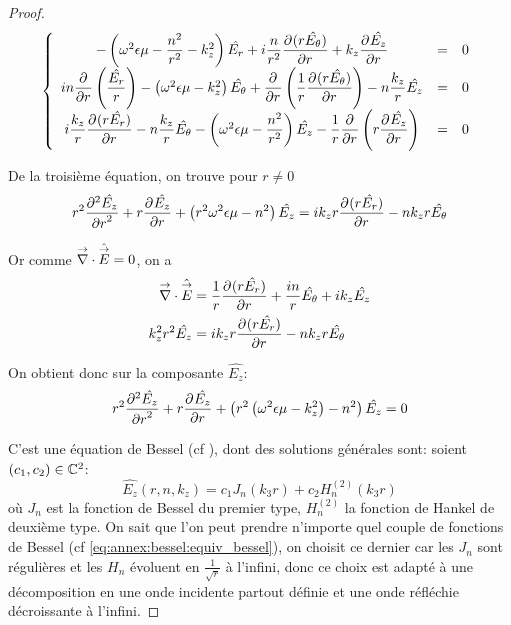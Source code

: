 \begin{proof}
    \begin{equation}
      \left\lbrace
      \begin{array}{ccc}
        -\left(\w^2\eps\mu -\frac{n^2}{r^2}  - k_z^2\right)\hat{E_r}  +i\frac{n}{r^2}\ddr{r}{(r\hat{E_\theta})}  +k_z\ddr{r}{\hat{E_z}} & = & 0\\
        in\ddr{r}{}\left(\frac{\hat{E_r}}{r}\right) -\left(\w^2\eps\mu - k_z^2\right)\hat{E_\theta} + \ddr{r}{}\left(\frac{1}{r}\ddr{r}{(r\hat{E_\theta})}\right)  - n\frac{k_z}{r}\hat{E_z} & = & 0\\
        i\frac{k_z}{r}\ddr{r}{(r\hat{E_r})}  - n\frac{k_z}{r}\hat{E_\theta}  -\left(\w^2\eps\mu - \frac{n^2}{r^2} \right)\hat{E_z} - \frac{1}{r}\ddr{r}{}\left(r\ddr{r}{\hat{E_z}}\right) & = & 0
      \end{array}
      \right.
    \end{equation}

    De la troisième  équation, on trouve pour \(r\not=0\)
    \begin{equation}
    r^2 \ddr[2]{r}{\hat{E_z}} + r\ddr{r}{\hat{E_z}} + \left(r^2\w^2\eps\mu - n^2\right)\hat{E_z} =ik_zr\ddr{r}{(r\hat{E_r})} -  nk_zr\hat{E_\theta}
    \end{equation}

    Or comme \(\vdiv \hat \vE = 0\), on a
    \begin{align}
      \vdiv\hat \vE &= \frac{1}{r}\ddr{r}{(r\hat{E_r})} + \frac{in}{r}\hat{E_\theta} + ik_z\hat{E_z}
      \\
      k_z^2r^2 \hat{E_z} &= ik_zr\ddr{r}{(r\hat{E_r})} - nk_zr\hat{E_\theta}
    \end{align}

    On obtient donc sur la composante \(\hat{E_z}\):
    \begin{equation}
      r^2 \ddr[2]{r}{\hat{E_z}} + r\ddr{r}{\hat{E_z}} + \left(r^2\left(\w^2\eps\mu - k_z^2\right) - n^2\right)\hat{E_z} = 0
    \end{equation}

    C'est une équation de Bessel (cf \cite[eq (6.80)]{bowman_introduction_1958}), dont des solutions générales sont: soient \((c_1,c_2) \in \CC^2\):
     \begin{equation}
      \hat{E_z}(r,n,k_z) = c_1 J_n\left(k_3r\right) + c_2 H_n^{(2)}\left(k_3r\right)
    \end{equation}
    où \(J_n\) est la fonction de Bessel du premier type, \(H_n^{(2)}\) la fonction de Hankel de deuxième type.
    On sait que l'on peut prendre n'importe quel couple de fonctions de Bessel (cf \eqref{eq:annex:bessel:equiv_bessel}), on choisit ce dernier car les \(J_n\) sont régulières et les \(H_n\) évoluent en \(\frac{1}{\sqrt{r}}\) à l'infini, donc ce choix est adapté à une décomposition en une onde incidente partout définie et une onde réfléchie décroissante à l'infini.


\end{proof}
